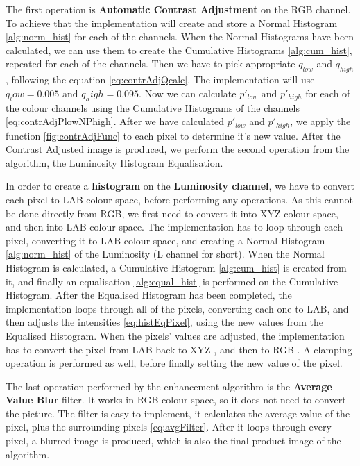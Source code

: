 \documentclass[journal,transmag]{IEEEtran}
\begin{document}
The first operation is \textbf{Automatic Contrast Adjustment} on the RGB channel. To achieve that the implementation will create and store a Normal Histogram \ref{alg:norm_hist} for each of the channels. When the Normal Histograms have been calculated, we can use them to create the Cumulative Histograms \ref{alg:cum_hist}, repeated for each of the channels. Then we have to pick appropriate $q_{low}$ and $q_{high}$, following the equation \ref{eq:contrAdjQcalc}. The implementation will use $q_low = 0.005$ and $q_high = 0.095$. Now we can calculate $p'_{low}$ and $p'_{high}$ for each of the colour channels using the Cumulative Histograms of the channels \ref{eq:contrAdjPlowNPhigh}. After we have calculated $p'_{low}$ and $p'_{high}$, we apply the function \ref{fig:contrAdjFunc} to each pixel to determine it's new value. After the Contrast Adjusted image is produced, we perform the second operation from the algorithm, the Luminosity Histogram Equalisation.

In order to create a \textbf{histogram} on the \textbf{Luminosity channel}, we have to convert each pixel to LAB colour space, before performing any operations. As this cannot be done directly from RGB, we first need to convert it into XYZ \cite{rgbTOxyz} colour space, and then into LAB \cite{xyzTOlab} colour space. The implementation has to loop through each pixel, converting it to LAB colour space, and creating a Normal Histogram \ref{alg:norm_hist} of the Luminosity (L channel for short). When the Normal Histogram is calculated, a Cumulative Histogram \ref{alg:cum_hist} is created from it, and finally an equalisation \ref{alg:equal_hist} is performed on the Cumulative Histogram. After the Equalised Histogram has been completed, the implementation loops through all of the pixels, converting each one to LAB, and then adjusts the intensities \ref{eq:histEqPixel}, using the new values from the Equalised Histogram. When the pixels' values are adjusted, the implementation has to convert the pixel from LAB back to XYZ \cite{labTOxyz}, and then to RGB \cite{xyzTOrgb}. A clamping operation is performed as well, before finally setting the new value of the pixel.

The last operation performed by the enhancement algorithm is the \textbf{Average Value Blur} filter. It works in RGB colour space, so it does not need to convert the picture. The filter is easy to implement, it calculates the average value of the pixel, plus the surrounding pixels \ref{eq:avgFilter}. After it loops through every pixel, a blurred image is produced, which is also the final product image of the algorithm.
\end{document}
